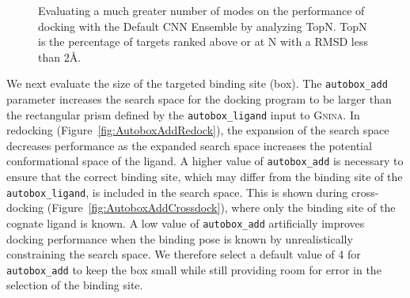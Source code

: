 \documentclass[linenumbers,doublespacing]{bmcart}
\begin{document}
\begin{figure}[tbh]
	\caption{Evaluating a much greater number of modes on the performance of docking with the Default CNN Ensemble by analyzing TopN. TopN is the percentage of targets ranked above or at N with a RMSD less than 2{\AA}.}
	\label{fig:num modes}
\end{figure}

We next evaluate the size of the targeted binding site (box). The \texttt{autobox\_add} parameter increases the search space for the docking program to be larger than the rectangular prism defined by the \texttt{autobox\_ligand} input to \textsc{Gnina}. In redocking (Figure~\ref{fig:AutoboxAddRedock}), the expansion of the search space decreases performance as the expanded search space increases the potential conformational space of the ligand. A higher value of \texttt{autobox\_add} is necessary to ensure that the correct binding site, which may differ from the binding site of the \texttt{autobox\_ligand}, is included in the search space. This is shown during cross-docking (Figure~\ref{fig:AutoboxAddCrossdock}), where only the binding site of the cognate ligand is known. A low value of \texttt{autobox\_add} artificially improves docking performance when the binding pose is known by unrealistically constraining the search space. We therefore select a default value of 4 for \texttt{autobox\_add} to keep the box small while still providing room for error in the selection of the binding site.
\end{document}
